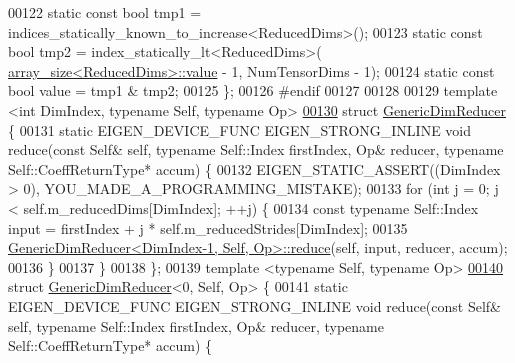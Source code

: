 \begin{DoxyCode}
00122   \textcolor{keyword}{static} \textcolor{keyword}{const} \textcolor{keywordtype}{bool} tmp1 = indices\_statically\_known\_to\_increase<ReducedDims>();
00123   \textcolor{keyword}{static} \textcolor{keyword}{const} \textcolor{keywordtype}{bool} tmp2 = index\_statically\_lt<ReducedDims>(
      \hyperlink{struct_eigen_1_1internal_1_1array__size}{array\_size<ReducedDims>::value} - 1, NumTensorDims - 1);
00124   \textcolor{keyword}{static} \textcolor{keyword}{const} \textcolor{keywordtype}{bool} value = tmp1 & tmp2;
00125 \};
00126 \textcolor{preprocessor}{#endif}
00127 
00128 
00129 \textcolor{keyword}{template} <\textcolor{keywordtype}{int} DimIndex, \textcolor{keyword}{typename} Self, \textcolor{keyword}{typename} Op>
\hyperlink{struct_eigen_1_1internal_1_1_generic_dim_reducer}{00130} \textcolor{keyword}{struct }\hyperlink{struct_eigen_1_1internal_1_1_generic_dim_reducer}{GenericDimReducer} \{
00131   \textcolor{keyword}{static} EIGEN\_DEVICE\_FUNC EIGEN\_STRONG\_INLINE \textcolor{keywordtype}{void} reduce(\textcolor{keyword}{const} Self& \textcolor{keyword}{self}, \textcolor{keyword}{typename} Self::Index 
      firstIndex, Op& reducer, \textcolor{keyword}{typename} Self::CoeffReturnType* accum) \{
00132     EIGEN\_STATIC\_ASSERT((DimIndex > 0), YOU\_MADE\_A\_PROGRAMMING\_MISTAKE);
00133     \textcolor{keywordflow}{for} (\textcolor{keywordtype}{int} j = 0; j < \textcolor{keyword}{self}.m\_reducedDims[DimIndex]; ++j) \{
00134       \textcolor{keyword}{const} \textcolor{keyword}{typename} Self::Index input = firstIndex + j * \textcolor{keyword}{self}.m\_reducedStrides[DimIndex];
00135       \hyperlink{struct_eigen_1_1internal_1_1_generic_dim_reducer}{GenericDimReducer<DimIndex-1, Self, Op>::reduce}(\textcolor{keyword}{self}, 
      input, reducer, accum);
00136     \}
00137   \}
00138 \};
00139 \textcolor{keyword}{template} <\textcolor{keyword}{typename} Self, \textcolor{keyword}{typename} Op>
\hyperlink{struct_eigen_1_1internal_1_1_generic_dim_reducer_3_010_00_01_self_00_01_op_01_4}{00140} \textcolor{keyword}{struct }\hyperlink{struct_eigen_1_1internal_1_1_generic_dim_reducer}{GenericDimReducer}<0, Self, Op> \{
00141   \textcolor{keyword}{static} EIGEN\_DEVICE\_FUNC EIGEN\_STRONG\_INLINE \textcolor{keywordtype}{void} reduce(\textcolor{keyword}{const} Self& \textcolor{keyword}{self}, \textcolor{keyword}{typename} Self::Index 
      firstIndex, Op& reducer, \textcolor{keyword}{typename} Self::CoeffReturnType* accum) \{

\end{DoxyCode}
